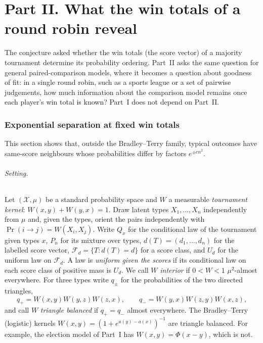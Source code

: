 \documentclass[11pt,a4paper]{article}
\theoremstyle{definition}
\begin{document}
\part*{Part II. What the win totals of a round robin reveal}

The conjecture asked whether the win totals (the score vector) of a majority tournament determine its probability ordering. Part~II asks the same question for general paired-comparison models, where it becomes a question about goodness of fit: in a single round robin, such as a sports league or a set of pairwise judgements, how much information about the comparison model remains once each player's win total is known? Part~I does not depend on Part~II.

\section{Exponential separation at fixed win totals}\label{sec:general-kernels}

This section shows that, outside the Bradley--Terry family, typical outcomes have same-score neighbours whose probabilities differ by factors $e^{\pm cn^2}$.

\paragraph{Setting.} Let $(\mathcal X,\mu)$ be a standard probability space and $W$ a measurable \emph{tournament kernel}: $W(x,y)+W(y,x)=1$. Draw latent types $X_1,\dots,X_n$ independently from $\mu$ and, given the types, orient the pairs independently with $\Pr(i\to j)=W(X_i,X_j)$. Write $Q_x$ for the conditional law of the tournament given types $x$, $P_n$ for its mixture over types, $d(T)=(d_1,\dots,d_n)$ for the labelled score vector, $\mathcal F_d=\{T:d(T)=d\}$ for a score class, and $U_d$ for the uniform law on $\mathcal F_d$. A law is \emph{uniform given the scores} if its conditional law on each score class of positive mass is $U_d$. We call $W$ \emph{interior} if $0<W<1$ $\mu^2$-almost everywhere. For three types write $q_\pm$ for the probabilities of the two directed triangles,
\[
 q_+=W(x,y)W(y,z)W(z,x),\qquad q_-=W(y,x)W(z,y)W(x,z),
\]
and call $W$ \emph{triangle balanced} if $q_+=q_-$ almost everywhere. The Bradley--Terry (logistic) kernels $W(x,y)=(1+e^{a(y)-a(x)})^{-1}$ are triangle balanced. For example, the election model of Part~I has $W(x,y)=\Phi(x-y)$, which is not.
\end{document}

